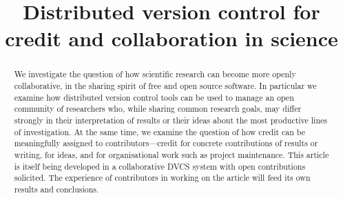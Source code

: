 \documentclass[rmp,twocolumn]{revtex4}
\begin{document}
\title{Distributed version control for credit and collaboration in science}
\begin{abstract}
We investigate the question of how scientific research can become more openly
collaborative, in the sharing spirit of free and open source software.  In
particular we examine how distributed version control tools can be used to
manage an open community of researchers who, while sharing common research
goals, may differ strongly in their interpretation of results or their ideas
about the most productive lines of investigation.  At the same time, we examine
the question of how credit can be meaningfully assigned to contributors---credit
for concrete contributions of results or writing, for ideas, and for
organisational work such as project maintenance.  This article is itself being
developed in a collaborative DVCS system with open contributions solicited.  The
experience of contributors in working on the article will feed its own results
and conclusions.
\end{abstract}

\maketitle



\end{document}
